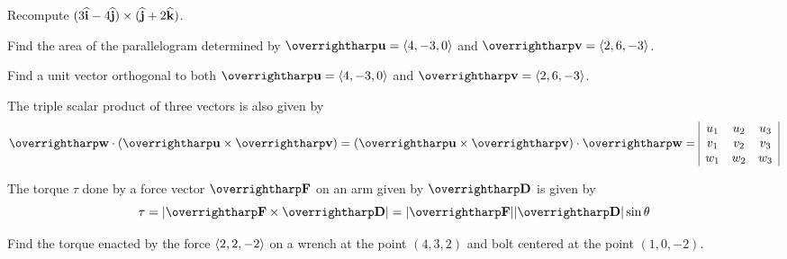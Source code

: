 \documentclass[letterpaper, twoside, 12pt]{book}
\begin{document}
\begin{problem}
  Recompute \((3\mathbf{\widehat{i}}-4\mathbf{\widehat{j}})\times(\mathbf{\widehat{j}}+2\mathbf{\widehat{k}})\).
\end{problem}

\begin{problem}
  Find the area of the parallelogram determined by $\harpvec{u}=\<4,-3,0\>$
  and $\harpvec{v}=\<2,6,-3\>$.
\end{problem}

\begin{problem}
  Find a unit vector orthogonal to both $\harpvec{u}=\<4,-3,0\>$
  and $\harpvec{v}=\<2,6,-3\>$.
\end{problem}

\begin{theorem}
  The triple scalar product of three vectors is also given by
    \[
      \harpvec{w}\cdot(\harpvec{u}\times\harpvec{v}) =
      (\harpvec{u}\times\harpvec{v})\cdot\harpvec{w} =
      \begin{array}{|c c c|}
      u_1 & u_2 & u_3 \\
      v_1 & v_2 & v_3 \\
      w_1 & w_2 & w_3 \\
      \end{array}
    \]
\end{theorem}


\begin{definition}
  The torque $\tau$ done by a force vector $\harpvec{F}$ on an arm given by
  $\harpvec{D}$ is given by
  \[
    \tau = |\harpvec{F} \times \harpvec{D}|
      =
    |\harpvec{F}||\harpvec{D}|\sin \theta
  \]
\end{definition}

\begin{problem}
  Find the torque enacted by the force \(\langle2,2,-2\rangle\) on a wrench at the point
  \((4,3,2)\) and bolt centered at the point \((1,0,-2)\).
\end{problem}
\end{document}

